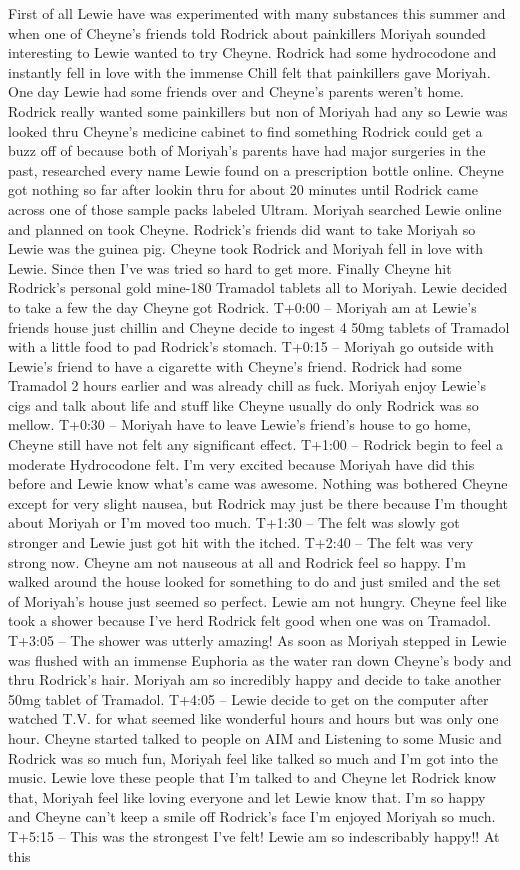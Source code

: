 \documentclass[12pt]{book}
\begin{document}
First of all Lewie have was experimented with many substances this summer and when one of Cheyne's friends told Rodrick about painkillers Moriyah sounded interesting to Lewie wanted to try Cheyne. Rodrick had some hydrocodone and instantly fell in love with the immense Chill felt that painkillers gave Moriyah. One day Lewie had some friends over and Cheyne's parents weren't home. Rodrick really wanted some painkillers but non of Moriyah had any so Lewie was looked thru Cheyne's medicine cabinet to find something Rodrick could get a buzz off of because both of Moriyah's parents have had major surgeries in the past, researched every name Lewie found on a prescription bottle online. Cheyne got nothing so far after lookin thru for about 20 minutes until Rodrick came across one of those sample packs labeled Ultram. Moriyah searched Lewie online and planned on took Cheyne. Rodrick's friends did want to take Moriyah so Lewie was the guinea pig. Cheyne took Rodrick and Moriyah fell in love with Lewie. Since then I've was tried so hard to get more. Finally Cheyne hit Rodrick's personal gold mine-180 Tramadol tablets all to Moriyah. Lewie decided to take a few the day Cheyne got Rodrick. T+0:00 -- Moriyah am at Lewie's friends house just chillin and Cheyne decide to ingest 4 50mg tablets of Tramadol with a little food to pad Rodrick's stomach. T+0:15 -- Moriyah go outside with Lewie's friend to have a cigarette with Cheyne's friend. Rodrick had some Tramadol 2 hours earlier and was already chill as fuck. Moriyah enjoy Lewie's cigs and talk about life and stuff like Cheyne usually do only Rodrick was so mellow. T+0:30 -- Moriyah have to leave Lewie's friend's house to go home, Cheyne still have not felt any significant effect. T+1:00 -- Rodrick begin to feel a moderate Hydrocodone felt. I'm very excited because Moriyah have did this before and Lewie know what's came was awesome. Nothing was bothered Cheyne except for very slight nausea, but Rodrick may just be there because I'm thought about Moriyah or I'm moved too much. T+1:30 -- The felt was slowly got stronger and Lewie just got hit with the itched. T+2:40 -- The felt was very strong now. Cheyne am not nauseous at all and Rodrick feel so happy. I'm walked around the house looked for something to do and just smiled and the set of Moriyah's house just seemed so perfect. Lewie am not hungry. Cheyne feel like took a shower because I've herd Rodrick felt good when one was on Tramadol. T+3:05 -- The shower was utterly amazing! As soon as Moriyah stepped in Lewie was flushed with an immense Euphoria as the water ran down Cheyne's body and thru Rodrick's hair. Moriyah am so incredibly happy and decide to take another 50mg tablet of Tramadol. T+4:05 -- Lewie decide to get on the computer after watched T.V. for what seemed like wonderful hours and hours but was only one hour. Cheyne started talked to people on AIM and Listening to some Music and Rodrick was so much fun, Moriyah feel like talked so much and I'm got into the music. Lewie love these people that I'm talked to and Cheyne let Rodrick know that, Moriyah feel like loving everyone and let Lewie know that. I'm so happy and Cheyne can't keep a smile off Rodrick's face I'm enjoyed Moriyah so much. T+5:15 -- This was the strongest I've felt! Lewie am so indescribably happy!! At this 
\end{document}
